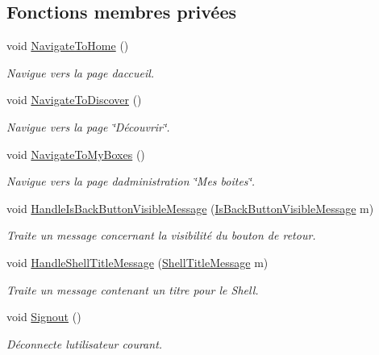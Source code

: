 \subsection*{Fonctions membres privées}
\begin{DoxyCompactItemize}
\item 
void \hyperlink{class_boxes_1_1_view_models_1_1_shell_view_model_a85f0193da593041ecb341c2ead9c83c2}{Navigate\+To\+Home} ()
\begin{DoxyCompactList}\small\item\em Navigue vers la page d\textquotesingle{}accueil. \end{DoxyCompactList}\item 
void \hyperlink{class_boxes_1_1_view_models_1_1_shell_view_model_a2c6ed8562a71a911a5debbf0a4be14ed}{Navigate\+To\+Discover} ()
\begin{DoxyCompactList}\small\item\em Navigue vers la page \char`\"{}\+Découvrir\char`\"{}. \end{DoxyCompactList}\item 
void \hyperlink{class_boxes_1_1_view_models_1_1_shell_view_model_a40e58efb894ea031c313ae5023c0a07b}{Navigate\+To\+My\+Boxes} ()
\begin{DoxyCompactList}\small\item\em Navigue vers la page d\textquotesingle{}administration \char`\"{}\+Mes boites\char`\"{}. \end{DoxyCompactList}\item 
void \hyperlink{class_boxes_1_1_view_models_1_1_shell_view_model_aeb95dc925b2ee3a47cc2b39904ed5e86}{Handle\+Is\+Back\+Button\+Visible\+Message} (\hyperlink{class_boxes_1_1_auxiliary_1_1_messaging_1_1_is_back_button_visible_message}{Is\+Back\+Button\+Visible\+Message} m)
\begin{DoxyCompactList}\small\item\em Traite un message concernant la visibilité du bouton de retour. \end{DoxyCompactList}\item 
void \hyperlink{class_boxes_1_1_view_models_1_1_shell_view_model_a47f0f0a2778f9690fcf81d6f5d8eeafe}{Handle\+Shell\+Title\+Message} (\hyperlink{class_boxes_1_1_auxiliary_1_1_messaging_1_1_shell_title_message}{Shell\+Title\+Message} m)
\begin{DoxyCompactList}\small\item\em Traite un message contenant un titre pour le Shell. \end{DoxyCompactList}\item 
void \hyperlink{class_boxes_1_1_view_models_1_1_shell_view_model_a95dad92da041940641b40b1f1251068f}{Signout} ()
\begin{DoxyCompactList}\small\item\em Déconnecte l\textquotesingle{}utilisateur courant. \end{DoxyCompactList}\end{DoxyCompactItemize}

